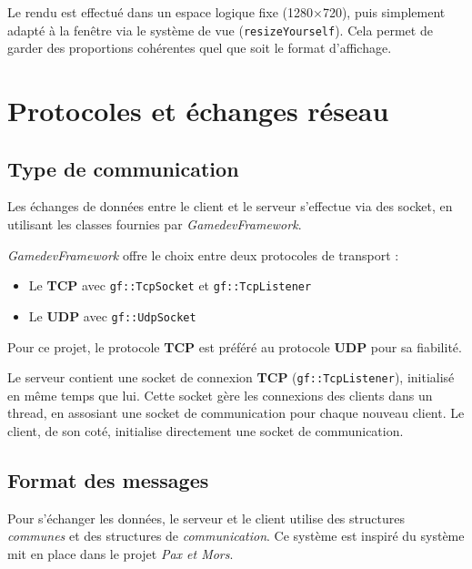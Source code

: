 \documentclass[a4paper, 11pt]{article}
\begin{document}
Le rendu est effectué dans un espace logique fixe  (1280×720), puis simplement adapté à la fenêtre via le système de vue (\texttt{resizeYourself}).
Cela permet de garder des proportions cohérentes quel que soit le format d’affichage.

\newpage

\section{Protocoles et échanges réseau}
\subsection{Type de communication}

Les échanges de données entre le client et le serveur s'effectue via des socket, en utilisant les classes fournies par \textit{GamedevFramework}.

\textit{GamedevFramework} offre le choix entre deux protocoles de transport :\\
\begin{itemize}
    \item Le \textbf{TCP} avec \texttt{gf::TcpSocket} et \texttt{gf::TcpListener}
    \item Le \textbf{UDP} avec \texttt{gf::UdpSocket}\\
  \end{itemize}

Pour ce projet, le protocole \textbf{TCP} est préféré au protocole \textbf{UDP} pour sa fiabilité.

Le serveur contient une socket de connexion \textbf{TCP} (\texttt{gf::TcpListener}), initialisé en même temps que lui. Cette socket gère les connexions des clients dans un thread, en assosiant une socket de communication pour chaque nouveau client. Le client, de son coté, initialise directement une socket de communication.

\subsection{Format des messages}
Pour s'échanger les données, le serveur et le client utilise des structures \textit{communes} et des structures de \textit{communication}. Ce système est inspiré du système mit en place dans le projet \textit{Pax et Mors}\cite{ggj2020}.\\
\end{document}
